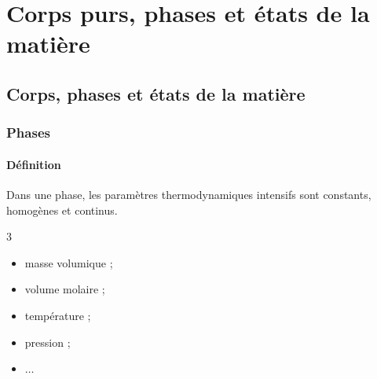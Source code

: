 \documentclass[a4paper]{book}
\begin{document}

\tableofcontents

\chapter{Corps purs, phases et états de la matière}

\section{Corps, phases et états de la matière}
\subsection{Phases}
\subsubsection{Définition}


Dans une phase, les paramètres thermodynamiques intensifs sont constants, homogènes et continus.
\begin{multicols}{3}\begin{itemize}
\item masse volumique ; 
\item volume molaire ;
\item température ;
\item pression ;
\item $\ldots$
\end{itemize}\end{multicols}
\end{document}
